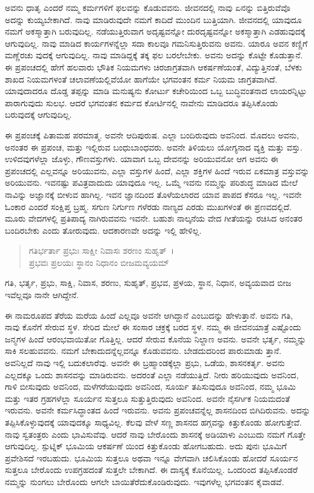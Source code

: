 ಅವನು ಧಾತೃ ಎಂದರೆ ನಮ್ಮ ಕರ್ಮಗಳಿಗೆ ಫಲವನ್ನು ಕೊಡುವವನು. ಜೀವನದಲ್ಲಿ ನಾವು ಏನನ್ನು ಬಿತ್ತಿರುವೆವೊ ಅದನ್ನು ಕುಯ್ಯಬೇಕಾಗಿದೆ. ನಾವು ಮಾಡಿರುವುದೇ ನಮಗೆ ಕಾದಿದೆ ಮುಂದಿನ ಬುತ್ತಿಯಾಗಿ. ಜೀವನದಲ್ಲಿ ಯಾವುದೂ ನಮಗೆ ಅಕಸ್ಮಾತ್ತಾಗಿ ಬರುವುದಿಲ್ಲ. ನಡೆಯುತ್ತಿರುವಾಗ ಅದೃಷ್ಟವನ್ನೋ ದುರದೃಷ್ಟವನ್ನೋ ಅಕಸ್ಮಾತ್ತಾಗಿ ಎಡಹುವುದಕ್ಕೆ ಆಗುವುದಿಲ್ಲ. ನಾವು ಮಾಡಿದ ಕಾರ್ಯಗಳನ್ನೆಲ್ಲಾ ಸದಾ ಕಾಲವೂ ಗಮನಿಸುತ್ತಿರುವನು ಅವನು. ಯಾರೂ ಅವನ ಕಣ್ಣಿಗೆ ಮಣ್ಣೆರಚು ವುದಕ್ಕೆ ಆಗುವುದಿಲ್ಲ. ನಾವು ಮಾಡಿದ್ದಕ್ಕೆ ತಕ್ಕ ಫಲ ಬರಲೇಬೇಕು. ಅವನು ಅದನ್ನು ಕೊಟ್ಟೇ ಕೊಡುತ್ತಾನೆ. ಈ ಪ್ರಪಂಚದಲ್ಲಿ ಹೇಗೆ ಹಲವಾರು ಭೌತಿಕ ನಿಯಮಗಳು ಚಿರಜಾಗ್ರತವಾಗಿ ಆಕರ್ಷಣೆಯಂತೆ, ವಿದ್ಯುತ್ತಿನಂತೆ, ಬೆಳಕು ಶಾಖದ ನಿಯಮಗಳಂತೆ ಚಲಾವಣೆಯಲ್ಲಿವೆಯೋ ಹಾಗೆಯೇ ಭಗವಂತನ ಕರ್ಮ ನಿಯಮ ಜಾಗ್ರತವಾಗಿದೆ. ಯಾವುದಾದರೂ ದೊಡ್ಡ ತಪ್ಪನ್ನು ಮಾಡಿ ಮನುಷ್ಯನು ಕೋರ್ಟು ಕಚೇರಿಯಿಂದ ಒಬ್ಬ ಬುದ್ಧಿವಂತನಾದ ಲಾಯರನ್ನಿಟ್ಟು ಪಾರಾಗುವುದು ಸುಲಭ. ಆದರೆ ಭಗವಂತನ ಕರ್ಮದ ಕೋರ್ಟಿನಲ್ಲಿ ನಾವೇನು ಮಾಡಿದರೂ ತಪ್ಪಿಸಿಕೊಂಡು ಬರುವುದಕ್ಕೆ ಆಗುವುದಿಲ್ಲ.

ಈ ಪ್ರಪಂಚಕ್ಕೆ ಪಿತಾಮಹ ಪರಮಾತ್ಮ. ಅವನೇ ಆದಿಪುರುಷ. ಎಲ್ಲಾ ಬಂದಿರುವುದು ಅವನಿಂದ. ಮೊದಲು ಅವನು, ಅನಂತರ ಈ ಪ್ರಪಂಚ, ಮತ್ತು ಇಲ್ಲಿರುವ ಬಂಧುಬಾಂಧವರು. ಅವನೇ ತಿಳಿಯಲು ಯೋಗ್ಯನಾದ ವ್ಯಕ್ತಿ ಮತ್ತು ವಸ್ತು. ಉಳಿದವುಗಳೆಲ್ಲಾ ಜೊಳ್ಳು, ಗೌಣವಸ್ತುಗಳು. ಯಾವಾಗ ಒಬ್ಬ ದೇವನನ್ನು ಅರಿಯುವನೋ ಆಗ ಅವನು ಈ ಪ್ರಪಂಚದಲ್ಲಿ ಎಲ್ಲವನ್ನೂ ಅರಿಯುವನು, ಎಲ್ಲಾ ವಸ್ತುಗಳ ಹಿಂದೆ, ಎಲ್ಲಾ ಶಕ್ತಿಗಳ ಹಿಂದೆ ಇರುವ ಏಕಮಾತ್ರ ವಸ್ತುವನ್ನು ಅರಿಯುವನು. ಇವನಷ್ಟು ಪವಿತ್ರವಾದುದು ಯಾವುದೂ ಇಲ್ಲ. ಒಮ್ಮೆ ಇವನು ನಮ್ಮನ್ನು ಪರಿಶುದ್ಧ ಮಾಡಿದ ಮೇಲೆ ನಾವಿನ್ನು ಅಜ್ಞಾನಕ್ಕೆ ಬೀಳುವ ಹಾಗಿಲ್ಲ. ಇವನ ಜ್ಞಾನದಿಂದ ತೊಳೆಯಲಾರದ ಯಾವ ಪಾಪದ ಕೆಸರೂ ಇಲ್ಲ. ಇವನೇ ಓಂಕಾರ ಎಂದರೆ ಸಂಕ್ಷಿಪ್ತ ಬ್ರಹ್ಮ. ಸಗುಣ ನಿರ್ಗುಣ ಗಳೆರಡು ನಾಣ್ಯದ ಎರಡು ಮುಖಗಳಂತೆ ಈ ಪ್ರಣವದಲ್ಲಿದೆ. ಮೂರು ವೇದಗಳಲ್ಲಿ ಪ್ರತಿಪಾದ್ಯ ನಾಗಿರುವವನು ಇವನೇ. ಬಹುಶಃ ನಾಲ್ಕನೆಯ ವೇದ ಗೀತೆಯನ್ನು ರಚಿಸಿದ ಅನಂತರ ಬಂದಿರಬೇಕು ಎಂದು ತೋರುವುದು. ಆದಕಾರಣವೇ ಅದನ್ನು ಇಲ್ಲಿ ಹೇಳಿಲ್ಲ.

\begin{verse}
ಗತಿರ್ಭರ್ತಾ ಪ್ರಭುಃ ಸಾಕ್ಷೀ ನಿವಾಸಃ ಶರಣಂ ಸುಹೃತ್~।\\ಪ್ರಭವಃ ಪ್ರಲಯಃ ಸ್ಥಾನಂ ನಿಧಾನಂ ಬೀಜಮವ್ಯಯಮ್ 
\end{verse}

{\small ಗತಿ, ಭರ್ತೃ, ಪ್ರಭು, ಸಾಕ್ಷಿ, ನಿವಾಸ, ಶರಣು, ಸುಹೃತ್, ಪ್ರಭವ, ಪ್ರಳಯ, ಸ್ಥಾನ, ನಿಧಾನ, ಅವ್ಯಯವಾದ ಬೀಜ ಇವೆಲ್ಲವೂ ನಾನೇ ಆಗಿದ್ದೇನೆ.}

ಈ ನಾಮರೂಪದ ತೆರೆಯ ಮರೆಯ ಹಿಂದೆ ಎಲ್ಲವೂ ಅವನೇ ಆಗಿದ್ದಾನೆ ಎಂಬುದನ್ನು ಹೇಳುತ್ತಾನೆ. ಅವನು ಗತಿ, ನಾವು ಕೊನೆಗೆ ಸೇರುವ ಸ್ಥಳ. ಸೇರಿದ ಮೇಲೆ ಈ ಸಂಸಾರ ಚಕ್ರಕ್ಕೆ ಬರದ ಸ್ಥಳ. ನಮ್ಮ ಈ ಜೀವನಯಾತ್ರೆ ಎಷ್ಟೊಂದು ಜನ್ಮಗಳ ಹಿಂದೆ ಆರಂಭವಾಯಿತೋ ಗೊತ್ತಿಲ್ಲ. ಆದರೆ ಸೇರುವ ಕೊನೆಯ ನಿಲ್ದಾಣ ಅವನು. ಅವನೇ ಭರ್ತೃ, ನಮ್ಮನ್ನು ಸಾಕಿ ಸಲಹುವವನು. ನಮಗೆ ಬೇಕಾದುದನ್ನೆಲ್ಲವನ್ನೂ ಕೊಡುವವನು. ಬೇಡದುದರಿಂದ ಪಾರುಮಾಡು ತ್ತಾನೆ. ಅವನಿಲ್ಲದೆ ನಾವು ಇಲ್ಲಿ ಬದುಕಲಾರೆವು. ಅವನೇ ಈ ಬ್ರಹ್ಮಾಂಡಕ್ಕೆಲ್ಲಾ ಪ್ರಭು, ಒಡೆಯ, ಶಾಸನಕರ್ತೃ. ಅವನು ಎಲ್ಲದಕ್ಕೂ ಒಂದು ಶಾಸನವನ್ನು ಮಾಡಿರುವನು. ಅದರಂತೆ ಎಲ್ಲಾ ನಡೆಯುತ್ತಿದೆ. ನೀರು ಹರಿಯುವುದು ಅವನಿಂದ, ಗಾಳಿ ಬೀಸುವುದು ಅವನಿಂದ, ಮಳೆಗರೆಯುವುದು ಅವನಿಂದ, ಸೂರ್ಯ ತಪಿಸುವುದೂ ಅವನಿಂದ, ನಮ್ಮ ಭೂಮಿ ಮತ್ತು ಇತರ ಗ್ರಹಗಳೆಲ್ಲಾ ಸೂರ್ಯನ ಸುತ್ತಲೂ ಸುತ್ತುತ್ತಿರುವುದು ಅವನಿಂದ. ಅವನೇ ನೈಸರ್ಗಿಕ ನಿಯಮದಂತೆ ಇರುವನು. ಅವನೇ ಕರ್ಮಸಿದ್ಧಾಂತದ ಹಿಂದೆ ಇರುವನು. ಅವನು ಪ್ರಪಂಚವನ್ನೆಲ್ಲ ಶಾಸನದಿಂದ ಬಿಗಿದಿರುವನು. ಅದನ್ನು ತಪ್ಪಿಸಿಕೊಳ್ಳುವುದಕ್ಕೆ ಯಾವುದಕ್ಕೂ ಸಾಧ್ಯವಿಲ್ಲ. ಕೆಲವು ವೇಳೆ ಸಣ್ಣ ಶಾಸನದ ಹಗ್ಗವನ್ನು ಕಿತ್ತುಕೊಂಡು ಹೋಗುತ್ತೇವೆ. ನಾವು ಸ್ವತಂತ್ರರು ಎಂದು ಭಾವಿಸುವೆವು. ಆದರೆ ನಾವು ಬೇರೊಂದು ಶಾಸನಕ್ಕೆ ಅಡಿಯಾಳು ಎಂಬುದು ನಮಗೆ ಗೊತ್ತೇ ಆಗುವುದಿಲ್ಲ. ಸ್ಪುಟ್ನಿಕ್ ಭೂಮಿಯ ಆಕರ್ಷಣೆ ಯಿಂದ ಕಿತ್ತುಕೊಂಡು ಹೋಗಬಹುದು. ಅದು ಪುನಃ ಭೂಮಿಗೆ ಪ್ರವೇಶಿಸದೆ ಇರಬಹುದು. ಭೂಮಿಯ ಸುತ್ತಲೂ ಅಥವಾ ಇನ್ನೂ ವೇಗವಾಗಿ ಚಲಿಸಿಕೊಂಡು ಹೋದರೆ ಸೂರ್ಯನ ಸುತ್ತಲೂ ಬೇರೊಂದು ಉಪಗ್ರಹದಂತೆ ಸುತ್ತಲೇ ಬೇಕಾಗಿದೆ. ಈ ದಾಸ್ಯಕ್ಕೆ ಕೊನೆಯಿಲ್ಲ. ಒಂದರಿಂದ ತಪ್ಪಿಸಿಕೊಂಡರೆ ನಮ್ಮನ್ನು ನುಂಗಲು ಬೇರೊಂದು ಆಗಲೇ ಬಾಯಿತೆರೆದುಕೊಂಡಿರುವುದು. ಇವುಗಳೆಲ್ಲ ಭಗವಂತನ ಕೈವಾಡವೆ.

